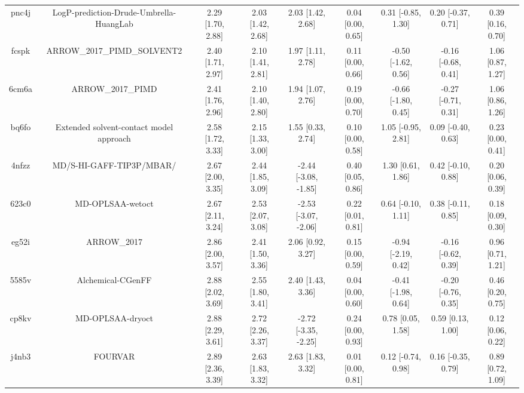 \documentclass{article}
\begin{document}
\begin{center}
\begin{longtable}{|ccccccccc|}
 pnc4j &            LogP-prediction-Drude-Umbrella-HuangLab &  2.29 [1.70, 2.88] &  2.03 [1.42, 2.68] &     2.03 [1.42, 2.68] &  0.04 [0.00, 0.65] &   0.31 [-0.85, 1.30] &   0.20 [-0.37, 0.71] &     0.39 [0.16, 0.70] \\
 fcspk &                        ARROW\_2017\_PIMD\_SOLVENT2 &  2.40 [1.71, 2.97] &  2.10 [1.41, 2.81] &     1.97 [1.11, 2.78] &  0.11 [0.00, 0.66] &  -0.50 [-1.62, 0.56] &  -0.16 [-0.68, 0.41] &     1.06 [0.87, 1.27] \\
 6cm6a &                                  ARROW\_2017\_PIMD &  2.41 [1.76, 2.96] &  2.10 [1.40, 2.80] &     1.94 [1.07, 2.76] &  0.19 [0.00, 0.70] &  -0.66 [-1.80, 0.45] &  -0.27 [-0.71, 0.31] &     1.06 [0.86, 1.26] \\
 bq6fo &            Extended solvent-contact model approach &  2.58 [1.72, 3.33] &  2.15 [1.33, 3.00] &     1.55 [0.33, 2.74] &  0.10 [0.00, 0.58] &   1.05 [-0.95, 2.81] &   0.09 [-0.40, 0.63] &     0.23 [0.00, 0.41] \\
 4nfzz &                           MD/S-HI-GAFF-TIP3P/MBAR/ &  2.67 [2.00, 3.35] &  2.44 [1.85, 3.09] &  -2.44 [-3.08, -1.85] &  0.40 [0.05, 0.86] &    1.30 [0.61, 1.86] &   0.42 [-0.10, 0.88] &     0.20 [0.06, 0.39] \\
 623c0 &                                   MD-OPLSAA-wetoct &  2.67 [2.11, 3.24] &  2.53 [2.07, 3.08] &  -2.53 [-3.07, -2.06] &  0.22 [0.01, 0.81] &   0.64 [-0.10, 1.11] &   0.38 [-0.11, 0.85] &     0.18 [0.09, 0.30] \\
 eg52i &                                        ARROW\_2017 &  2.86 [2.00, 3.57] &  2.41 [1.50, 3.36] &     2.06 [0.92, 3.27] &  0.15 [0.00, 0.59] &  -0.94 [-2.19, 0.42] &  -0.16 [-0.62, 0.39] &     0.96 [0.71, 1.21] \\
 5585v &                                  Alchemical-CGenFF &  2.88 [2.02, 3.69] &  2.55 [1.80, 3.41] &     2.40 [1.43, 3.36] &  0.04 [0.00, 0.60] &  -0.41 [-1.98, 0.64] &  -0.20 [-0.76, 0.35] &     0.46 [0.20, 0.75] \\
 cp8kv &                                   MD-OPLSAA-dryoct &  2.88 [2.29, 3.61] &  2.72 [2.26, 3.37] &  -2.72 [-3.35, -2.25] &  0.24 [0.00, 0.93] &    0.78 [0.05, 1.58] &    0.59 [0.13, 1.00] &     0.12 [0.06, 0.22] \\
 j4nb3 &                                            FOURVAR &  2.89 [2.36, 3.39] &  2.63 [1.83, 3.32] &     2.63 [1.83, 3.32] &  0.01 [0.00, 0.81] &   0.12 [-0.74, 0.98] &   0.16 [-0.35, 0.79] &     0.89 [0.72, 1.09] \\

\end{longtable}
\end{center}
\end{document}
